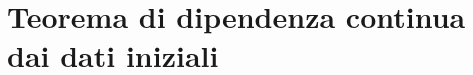 \newcommand{\settingH}{%
    Sia dato il problema di Cauchy
    \begin{align*}
        \begin{cases}
            \bm{u}'(t)=\bm{f}\left(t,\bm{u}(t)\right)\\ 
            \bm{u}(t_0)= \bm{x}_0
        \end{cases} && (t_0,\bm{x}_0) \in \Omega
    \end{align*}
    con $ \bm{f}: \Omega \subseteq \R\times \R^{n}\to \R^{n}$, continua e localmente lipschitziana nella seconda variabile e uniformemente nella prima.}

\chapter{Teorema di dipendenza continua dai dati iniziali}
